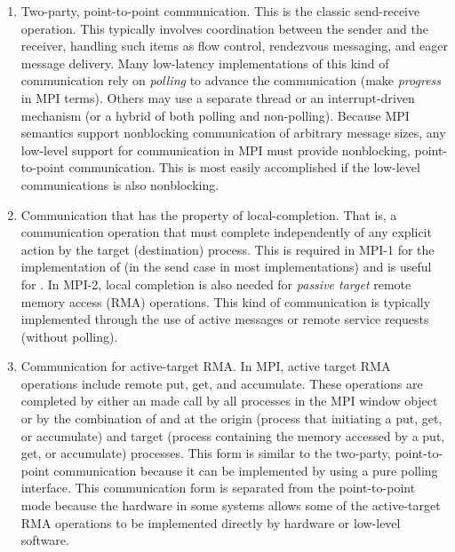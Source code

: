 \begin{enumerate}
\item Two-party, point-to-point communication.  This is the classic
send-receive operation.  This typically involves coordination between
the sender and the receiver, handling such items as flow control,
rendezvous messaging, and eager message delivery.  Many low-latency
implementations of this kind of communication rely on \emph{polling}
to advance the communication (make \emph{progress} in
MPI terms). 
Others may use a separate thread or an interrupt-driven mechanism (or
a hybrid of both polling and non-polling). 
Because MPI semantics support nonblocking communication of arbitrary
message sizes, any low-level support for communication in MPI must
provide nonblocking, point-to-point communication.  This is most
easily accomplished if the low-level communications is also
nonblocking.

\item Communication that has the property of local-completion. That
is, a communication operation that must complete independently of any
explicit action by the target (destination) process.  This is required
in MPI-1 for the implementation of  (in the send
case in most implementations) and is useful for .
In MPI-2, local completion is also needed for \emph{passive target}
remote memory access (RMA) operations.  This kind of communication is
typically implemented through the use of active messages or remote
service requests (without polling).

\item Communication for active-target RMA.  In MPI, active target RMA
operations include remote put, get, and accumulate.  These operations
are completed by either an  made call by all processes
in the MPI window object or by the combination of
 and  at the origin (process
that initiating a put, get, or accumulate) and target (process
containing the memory accessed by a put, get, or accumulate)
processes.  This form is similar to the two-party, point-to-point
communication because it can be implemented by using a pure polling
interface. This communication form is separated from the point-to-point
mode because the hardware in some systems allows some of the
active-target RMA operations to be implemented directly by hardware or
low-level software.


\end{enumerate}

